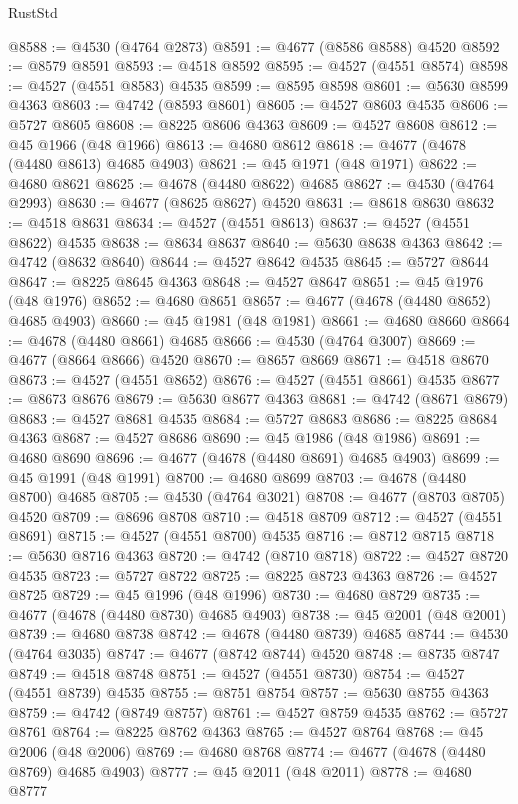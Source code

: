 \begin{lexlean}{RustStd}
\begin{coremodule}
@8588 := @4530 (@4764 @2873)
@8591 := @4677 (@8586 @8588) @4520
@8592 := @8579 @8591
@8593 := @4518 @8592
@8595 := @4527 (@4551 @8574)
@8598 := @4527 (@4551 @8583) @4535
@8599 := @8595 @8598
@8601 := @5630 @8599 @4363
@8603 := @4742 (@8593 @8601)
@8605 := @4527 @8603 @4535
@8606 := @5727 @8605
@8608 := @8225 @8606 @4363
@8609 := @4527 @8608
@8612 := @45 @1966 (@48 @1966)
@8613 := @4680 @8612
@8618 := @4677 (@4678 (@4480 @8613) @4685 @4903)
@8621 := @45 @1971 (@48 @1971)
@8622 := @4680 @8621
@8625 := @4678 (@4480 @8622) @4685
@8627 := @4530 (@4764 @2993)
@8630 := @4677 (@8625 @8627) @4520
@8631 := @8618 @8630
@8632 := @4518 @8631
@8634 := @4527 (@4551 @8613)
@8637 := @4527 (@4551 @8622) @4535
@8638 := @8634 @8637
@8640 := @5630 @8638 @4363
@8642 := @4742 (@8632 @8640)
@8644 := @4527 @8642 @4535
@8645 := @5727 @8644
@8647 := @8225 @8645 @4363
@8648 := @4527 @8647
@8651 := @45 @1976 (@48 @1976)
@8652 := @4680 @8651
@8657 := @4677 (@4678 (@4480 @8652) @4685 @4903)
@8660 := @45 @1981 (@48 @1981)
@8661 := @4680 @8660
@8664 := @4678 (@4480 @8661) @4685
@8666 := @4530 (@4764 @3007)
@8669 := @4677 (@8664 @8666) @4520
@8670 := @8657 @8669
@8671 := @4518 @8670
@8673 := @4527 (@4551 @8652)
@8676 := @4527 (@4551 @8661) @4535
@8677 := @8673 @8676
@8679 := @5630 @8677 @4363
@8681 := @4742 (@8671 @8679)
@8683 := @4527 @8681 @4535
@8684 := @5727 @8683
@8686 := @8225 @8684 @4363
@8687 := @4527 @8686
@8690 := @45 @1986 (@48 @1986)
@8691 := @4680 @8690
@8696 := @4677 (@4678 (@4480 @8691) @4685 @4903)
@8699 := @45 @1991 (@48 @1991)
@8700 := @4680 @8699
@8703 := @4678 (@4480 @8700) @4685
@8705 := @4530 (@4764 @3021)
@8708 := @4677 (@8703 @8705) @4520
@8709 := @8696 @8708
@8710 := @4518 @8709
@8712 := @4527 (@4551 @8691)
@8715 := @4527 (@4551 @8700) @4535
@8716 := @8712 @8715
@8718 := @5630 @8716 @4363
@8720 := @4742 (@8710 @8718)
@8722 := @4527 @8720 @4535
@8723 := @5727 @8722
@8725 := @8225 @8723 @4363
@8726 := @4527 @8725
@8729 := @45 @1996 (@48 @1996)
@8730 := @4680 @8729
@8735 := @4677 (@4678 (@4480 @8730) @4685 @4903)
@8738 := @45 @2001 (@48 @2001)
@8739 := @4680 @8738
@8742 := @4678 (@4480 @8739) @4685
@8744 := @4530 (@4764 @3035)
@8747 := @4677 (@8742 @8744) @4520
@8748 := @8735 @8747
@8749 := @4518 @8748
@8751 := @4527 (@4551 @8730)
@8754 := @4527 (@4551 @8739) @4535
@8755 := @8751 @8754
@8757 := @5630 @8755 @4363
@8759 := @4742 (@8749 @8757)
@8761 := @4527 @8759 @4535
@8762 := @5727 @8761
@8764 := @8225 @8762 @4363
@8765 := @4527 @8764
@8768 := @45 @2006 (@48 @2006)
@8769 := @4680 @8768
@8774 := @4677 (@4678 (@4480 @8769) @4685 @4903)
@8777 := @45 @2011 (@48 @2011)
@8778 := @4680 @8777

\end{coremodule}
\end{lexlean}
